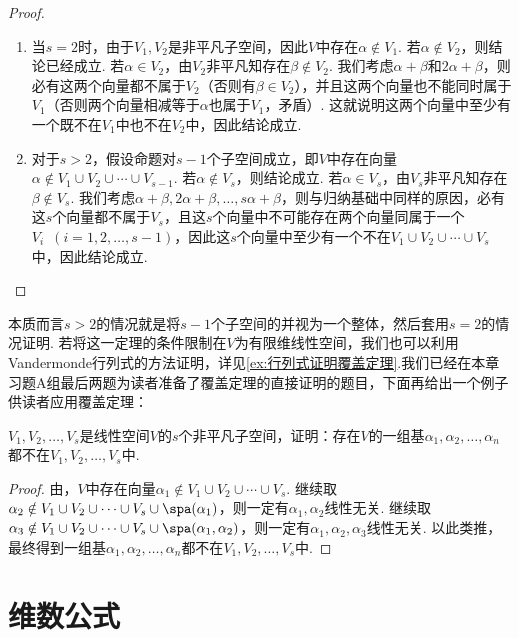 \begin{proof}
    \begin{enumerate}
        \item 当$s=2$时，由于$V_1,V_2$是非平凡子空间，因此$V$中存在$\alpha\notin V_1$. 若$\alpha\notin V_2$，则结论已经成立. 若$\alpha\in V_2$，由$V_2$非平凡知存在$\beta\notin V_2$. 我们考虑$\alpha+\beta$和$2\alpha+\beta$，则必有这两个向量都不属于$V_2$（否则有$\beta\in V_2$），并且这两个向量也不能同时属于$V_1$（否则两个向量相减等于$\alpha$也属于$V_1$，矛盾）. 这就说明这两个向量中至少有一个既不在$V_1$中也不在$V_2$中，因此结论成立.

        \item 对于$s>2$，假设命题对$s-1$个子空间成立，即$V$中存在向量$\alpha\notin V_1\cup V_2\cup\cdots\cup V_{s-1}$. 若$\alpha\notin V_s$，则结论成立. 若$\alpha\in V_s$，由$V_s$非平凡知存在$\beta\notin V_s$. 我们考虑$\alpha+\beta,2\alpha+\beta,\ldots,s\alpha+\beta$，则与归纳基础中同样的原因，必有这$s$个向量都不属于$V_s$，且这$s$个向量中不可能存在两个向量同属于一个$V_i\enspace(i=1,2,\ldots,s-1)$，因此这$s$个向量中至少有一个不在$V_1\cup V_2\cup\cdots\cup V_s$中，因此结论成立.
    \end{enumerate}
\end{proof}

本质而言$s>2$的情况就是将$s-1$个子空间的并视为一个整体，然后套用$s=2$的情况证明. 若将这一定理的条件限制在$V$为有限维线性空间，我们也可以利用Vandermonde行列式的方法证明，详见\autoref{ex:行列式证明覆盖定理}.我们已经在本章习题A组最后两题为读者准备了覆盖定理的直接证明的题目，下面再给出一个例子供读者应用覆盖定理：
\begin{example}{}{}
    $V_1,V_2,\ldots,V_s$是线性空间$V$的$s$个非平凡子空间，证明：存在$V$的一组基$\alpha_1,\alpha_2,\ldots,\alpha_n$都不在$V_1,V_2,\ldots,V_s$中.
\end{example}

\begin{proof}
    由，$V$中存在向量$\alpha_1\notin V_1\cup V_2\cup\cdots\cup V_s$. 继续取$\alpha_2\notin V_1\cup V_2\cup\cdots\cup V_s\cup\spa(\alpha_1)$，则一定有$\alpha_1,\alpha_2$线性无关. 继续取$\alpha_3\notin V_1\cup V_2\cup\cdots\cup V_s\cup\spa(\alpha_1,\alpha_2)$，则一定有$\alpha_1,\alpha_2,\alpha_3$线性无关. 以此类推，最终得到一组基$\alpha_1,\alpha_2,\ldots,\alpha_n$都不在$V_1,V_2,\ldots,V_s$中.
\end{proof}

\section{维数公式}

